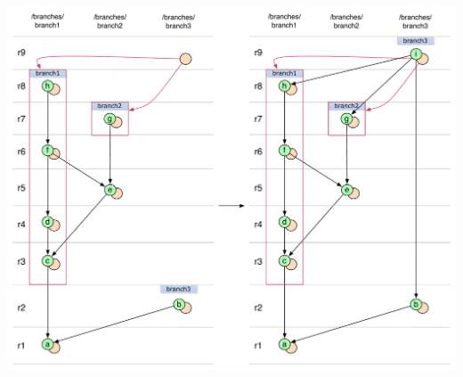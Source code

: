 \begin{center}
\includegraphics[width=\textwidth]{img/diagrams/octopus_merge_svn_to_git.pdf}%
\label{octopus_merge_svn_to_git}%
\end{center}
